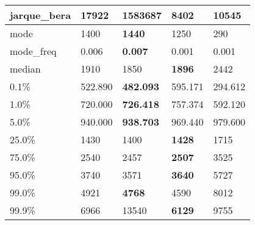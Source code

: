 \begin{table}[H]
\begin{tabular}{|l|m{10em}|m{10em}|m{10em}|m{10em}|}
\hline jarque\_bera & 17922 & \cellcolor[rgb]{0.9, 0.54, 0.52} 1583687 & 8402 & \bfseries 10545 \\
\hline mode & 1400 & \bfseries 1440 & 1250 & \cellcolor[rgb]{0.9, 0.54, 0.52} 290 \\
\hline mode\_freq & 0.006 & \bfseries 0.007 & \cellcolor[rgb]{0.9, 0.54, 0.52} 0.001 & 0.001 \\
\hline median & 1910 & 1850 & \bfseries 1896 & \cellcolor[rgb]{0.9, 0.54, 0.52} 2442 \\
\hline 0.1\% & 522.890 & \bfseries 482.093 & 595.171 & \cellcolor[rgb]{0.9, 0.54, 0.52} 294.612 \\
\hline 1.0\% & 720.000 & \bfseries 726.418 & 757.374 & \cellcolor[rgb]{0.9, 0.54, 0.52} 592.120 \\
\hline 5.0\% & 940.000 & \bfseries 938.703 & 969.440 & \cellcolor[rgb]{0.9, 0.54, 0.52} 979.600 \\
\hline 25.0\% & 1430 & 1400 & \bfseries 1428 & \cellcolor[rgb]{0.9, 0.54, 0.52} 1715 \\
\hline 75.0\% & 2540 & 2457 & \bfseries 2507 & \cellcolor[rgb]{0.9, 0.54, 0.52} 3525 \\
\hline 95.0\% & 3740 & 3571 & \bfseries 3640 & \cellcolor[rgb]{0.9, 0.54, 0.52} 5727 \\
\hline 99.0\% & 4921 & \bfseries 4768 & 4590 & \cellcolor[rgb]{0.9, 0.54, 0.52} 8012 \\
\hline 99.9\% & 6966 & \cellcolor[rgb]{0.9, 0.54, 0.52} 13540 & \bfseries 6129 & 9755 \\
\hline
\end{tabular}
\end{table}
